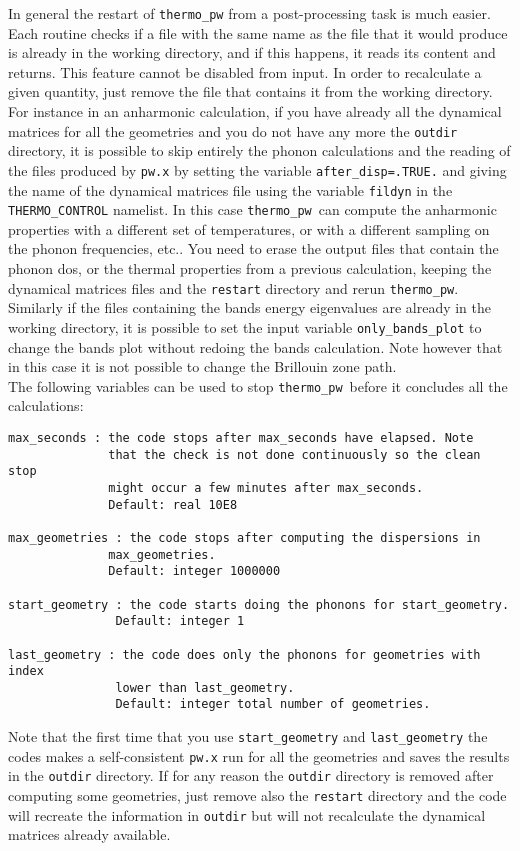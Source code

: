 \documentclass[12pt,a4paper]{article}
\def\thermo{\texttt{thermo\_pw}}
\begin{document}
In general the restart of \texttt{thermo\_pw} from a post-processing task
is much easier.
Each routine checks if a file with the same name
as the file that it would produce is already in the working directory,
and if this happens, it reads its content and returns. This feature cannot be
disabled from input. In order to recalculate a given quantity, just remove
the file that contains it from the working directory.
For instance in an anharmonic calculation, if you have already all 
the dynamical 
matrices for all the geometries and you do not have any more the
\texttt{outdir} directory, it is possible to skip entirely
the phonon calculations and the reading of the files produced by
\texttt{pw.x} by setting the variable
\texttt{after\_disp=.TRUE.} and giving the name of the dynamical matrices file
using the variable \texttt{fildyn} in the \texttt{THERMO\_CONTROL} namelist. 
In this case \thermo\ can compute the anharmonic properties with a 
different set 
of temperatures, or with a different sampling on the phonon frequencies, 
etc.. You need to erase the output files that contain
the phonon dos, or the thermal properties from a previous calculation, keeping 
the dynamical matrices files and the \texttt{restart} directory and 
rerun \thermo.
Similarly if the files containing the bands energy eigenvalues are already
in the working directory, it is possible to set the input variable
\texttt{only\_bands\_plot} to change the bands plot without redoing the
bands calculation. Note however that in this case it is not possible 
to change the Brillouin zone path. \\
The following variables can be used to stop \thermo\ before it concludes all
the calculations:
\begin{verbatim}
max_seconds : the code stops after max_seconds have elapsed. Note
              that the check is not done continuously so the clean stop
              might occur a few minutes after max_seconds.
              Default: real 10E8

max_geometries : the code stops after computing the dispersions in 
              max_geometries.
              Default: integer 1000000

start_geometry : the code starts doing the phonons for start_geometry.
               Default: integer 1

last_geometry : the code does only the phonons for geometries with index 
               lower than last_geometry.
               Default: integer total number of geometries.
\end{verbatim}
Note that the first time that you use \texttt{start\_geometry} and 
\texttt{last\_geometry} the codes makes a self-consistent \texttt{pw.x} 
run for all the geometries and saves the results in the \texttt{outdir}
directory. If for any reason the \texttt{outdir} directory is removed 
after computing some geometries, just remove also the
\texttt{restart} directory and the code will recreate the information
in \texttt{outdir} but will not recalculate the dynamical matrices 
already available. 
\end{document}
